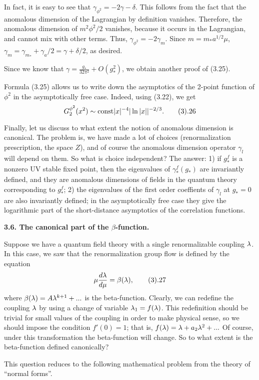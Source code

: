 In fact, it is easy to see that $\gamma_{\phi^2}=-2\gamma-\delta$. 
This follows from the fact that the anomalous dimension of
the Lagrangian by definition vanishes. Therefore, 
the anomalous dimension of $m^2\phi^2/2$ vanishes, because it occurs 
in the Lagrangian, and cannot mix with other terms. Thus, 
$\gamma_{\phi^2}=-2\gamma_m$. Since $m=m_*a^{1/2}\mu$, 
$\gamma_m=\gamma_{m_*}+\gamma_a/2=\gamma+\delta/2$, as desired. 

Since we know that $\gamma=\frac{g_*}{32\pi^2}+O(g_*^2)$, we obtain another 
proof of (3.25).

Formula (3.25) allows us to write down the asymptotics of the 2-point function
of $\phi^2$ in the asymptotically free case. Indeed, using (3.22), we get
$$
G_2^{\phi^2}(x^2)\sim \text{const} |x|^{-4}|\ln |x||^{-2/3}.\tag 3.26
$$

Finally, let us discuss to what extent the notion of anomalous dimension 
is canonical. The problem is, we have made a lot of choices (renormalization 
prescription, the space $Z$), and of course the anomalous dimension operator
$\gamma_l$ will depend on them. So what is choice independent?
The answer: 1) if $g_*^f$ is a nonzero UV stable fixed point, then 
the eigenvalues of $\gamma_*^f(g_*)$ are invariantly defined, and 
they are anomalous dimensions of fields in the quantum theory 
corresponding to $g_*^f$; 2) the eigenvalues of the first order coeffients 
of $\gamma_l$ at $g_*=0$ are also invariantly defined; in the asymptotically 
free case they give the logarithmic part of the short-distance asymptotics of
the correlation functions. 

{\bf 3.6. The canonical part of the $\beta$-function.}

Suppose we have a quantum field theory with a single renormalizable 
coupling $\lambda$. In this case, we saw that the renormalization group 
flow is defined by the equation
$$
\mu\frac{d\l}{d\mu}=\beta(\l), \tag 3.27
$$
where $\beta(\lambda)=A\lambda^{k+1}+...$ is the beta-function. 
Clearly, we can redefine the coupling $\lambda$ by using 
a change of variable $\lambda_1=f(\lambda)$. 
This redefinition should be trivial for small 
values of the coupling in order to make physical sense, 
so we should impose the condition 
$f'(0)=1$; that is, $f(\lambda)=\lambda+a_2\lambda^2+...$
Of course, under this transformation the beta-function will change. 
So to what extent is the beta-function defined canonically?

This question reduces to the following mathematical problem
from the theory of ``normal forms''.

